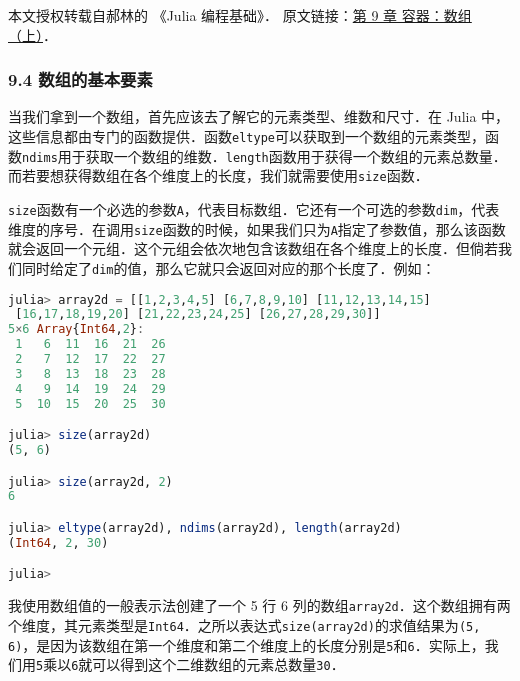 
本文授权转载自郝林的 《Julia 编程基础》． 原文链接：\href{https://github.com/hyper0x/JuliaBasics/blob/master/book/ch09.md}{第 9 章 容器：数组（上）}．


\subsubsection{9.4 数组的基本要素}

当我们拿到一个数组，首先应该去了解它的元素类型、维数和尺寸．在 Julia 中，这些信息都由专门的函数提供．函数\verb|eltype|可以获取到一个数组的元素类型，函数\verb|ndims|用于获取一个数组的维数．\verb|length|函数用于获得一个数组的元素总数量．而若要想获得数组在各个维度上的长度，我们就需要使用\verb|size|函数．

\verb|size|函数有一个必选的参数\verb|A|，代表目标数组．它还有一个可选的参数\verb|dim|，代表维度的序号．在调用\verb|size|函数的时候，如果我们只为\verb|A|指定了参数值，那么该函数就会返回一个元组．这个元组会依次地包含该数组在各个维度上的长度．但倘若我们同时给定了\verb|dim|的值，那么它就只会返回对应的那个长度了．例如：

\begin{lstlisting}[language=julia]
julia> array2d = [[1,2,3,4,5] [6,7,8,9,10] [11,12,13,14,15]
 [16,17,18,19,20] [21,22,23,24,25] [26,27,28,29,30]]
5×6 Array{Int64,2}:
 1   6  11  16  21  26
 2   7  12  17  22  27
 3   8  13  18  23  28
 4   9  14  19  24  29
 5  10  15  20  25  30

julia> size(array2d)
(5, 6)

julia> size(array2d, 2)
6

julia> eltype(array2d), ndims(array2d), length(array2d)
(Int64, 2, 30)

julia> 
\end{lstlisting}

我使用数组值的一般表示法创建了一个 5 行 6 列的数组\verb|array2d|．这个数组拥有两个维度，其元素类型是\verb|Int64|．之所以表达式\verb|size(array2d)|的求值结果为\verb|(5, 6)|，是因为该数组在第一个维度和第二个维度上的长度分别是\verb|5|和\verb|6|．实际上，我们用\verb|5|乘以\verb|6|就可以得到这个二维数组的元素总数量\verb|30|．